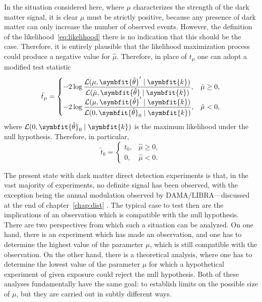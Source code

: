 \documentclass[b5paper, 10pt, twoside]{book}
\renewcommand{\vec}[1]{\symbfit{#1}}
\newcommand{\unitv}[1]{\symbfit{\hat{#1}}}
\begin{document}
In the situation considered here, where $\mu$ characterizes the strength of the dark matter signal, it is clear $\mu$ must be strictly positive, because any presence of dark matter can only increase the number of observed events. However, the definition of the likelihood~\eqref{eq:likelihood} there is no indication that this should be the case. Therefore, it is entirely plausible that the likelihood maximization process could produce a negative value for $\hat{\mu}$. Therefore, in place of $t_\mu$ one can adopt a modified test statistic \parencite{BaxterEtAl2021}
\begin{equation}
    \tilde{t}_\mu=
    \begin{cases}
        \displaystyle-2\log\frac{\mathcal{L}(\mu,\unitv{\theta}'\mid\vec{k})}{\mathcal{L}(\hat{\mu},\unitv{\theta}\mid\vec{k})},&\hat{\mu}\geq0,\\
        \displaystyle-2\log\frac{\mathcal{L}(\mu,\unitv{\theta}'\mid\vec{k})}{\mathcal{L}(0,\unitv{\theta}_0\mid\vec{k})},&\hat{\mu}<0,
    \end{cases}
\end{equation}
where $\mathcal{L}(0,\unitv{\theta}_0\mid\vec{k})$ is the maximum likelihood under the null hypothesis. Therefore, in particular,
\begin{equation}
    \tilde{t}_0=
    \begin{cases}
        t_0,&\hat{\mu}\geq0,\\
        0,&\hat{\mu}<0.
    \end{cases}
\end{equation}

The present state with dark matter direct detection experiments is that, in the vast majority of experiments, no definite signal has been observed, with the exception being the annual modulation observed by DAMA/LIBRA---discussed at the end of chapter~\ref{chap:dist} \parencite{BernabeiEtAl2023}. The typical case to test then are the implications of an observation which is compatible with the null hypothesis. There are two perspectives from which such a situation can be analyzed. On one hand, there is an experiment which has made an observation, and one has to determine the highest value of the parameter $\mu$, which is still compatible with the observation. On the other hand, there is a theoretical analysis, where one has to determine the lowest value of the parameter $\mu$ for which a hypothetical experiment of given exposure could reject the null hypothesis. Both of these analyses fundamentally have the same goal: to establish limits on the possible size of $\mu$, but they are carried out in subtly different ways.
\end{document}

